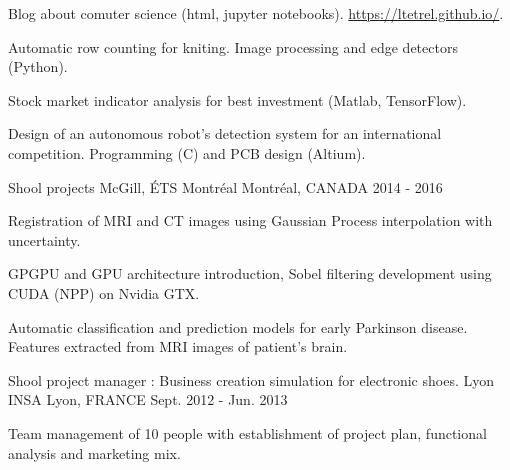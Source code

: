 


\begin{cventries}


\cventry
{} %
{} %
{} %
{} %
{ %
\vspace{-5mm}
\begin{cvitems}
\item {Blog about comuter science (html, jupyter notebooks). \url{https://ltetrel.github.io/}.}
\item {Automatic row counting for kniting. Image processing and edge detectors (Python).}
\item {Stock market indicator analysis for best investment (Matlab, TensorFlow).}
\item {Design of an autonomous robot's detection system for an international competition. Programming (C) and PCB design (Altium).}
\end{cvitems}
}


\cventry
{Shool projects} %
{McGill, ÉTS Montréal} %
{Montréal, CANADA} %
{2014 - 2016} %
{ %
\begin{cvitems}
\item {Registration of MRI and CT images using Gaussian Process interpolation with uncertainty.}
\item {GPGPU and GPU architecture introduction, Sobel filtering development using CUDA (NPP) on Nvidia GTX.}
\item {Automatic classification and prediction models for early Parkinson disease. Features extracted from MRI images of patient's brain.}
\end{cvitems}
}


\cventry
{Shool project manager : Business creation simulation for electronic shoes.} %
{Lyon INSA} %
{Lyon, FRANCE} %
{Sept. 2012 - Jun. 2013} %
{ %
\begin{cvitems}
\item {Team management of 10 people with establishment of project plan, functional analysis and marketing mix.}
\end{cvitems}
}


\end{cventries}

